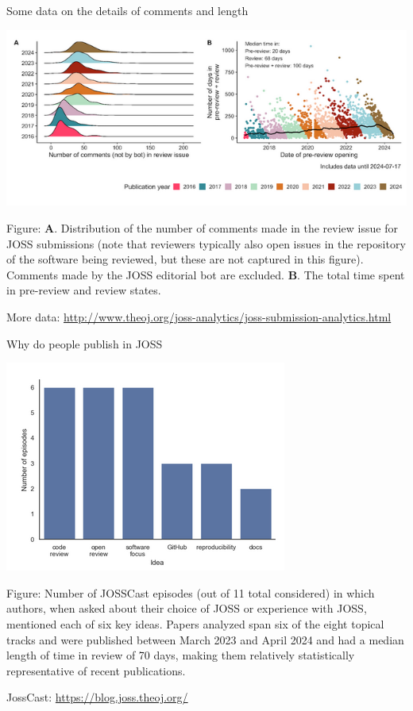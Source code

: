 \begin{frame}{Some data on the details of comments and length}

\includegraphics[width=\linewidth]{comments-and-lengths}

\small Figure: \textbf{A}. Distribution of the number of comments made in the review issue for JOSS submissions (note that reviewers typically also open issues in the repository of the software being reviewed, but these are not captured in this figure). Comments made by the JOSS editorial bot are excluded. \textbf{B}. The total time spent in pre-review and review states.


{\tiny More data: \url{http://www.theoj.org/joss-analytics/joss-submission-analytics.html}}    
\end{frame}

\begin{frame}{Why do people publish in JOSS}
\vspace{-0.5cm}
\begin{center}
\includegraphics[width=0.8\linewidth]{joss-cast}
\end{center}

\tiny Figure: Number of JOSSCast episodes (out of 11 total considered) in which authors, when asked about their choice of JOSS or experience with JOSS, mentioned each of six key ideas. Papers analyzed span six of the eight topical tracks and were published between March 2023 and April 2024 and had a median length of time in review of 70 days, making them relatively statistically representative of recent publications.

{\tiny JossCast: \url{https://blog.joss.theoj.org/}}    
\end{frame}


